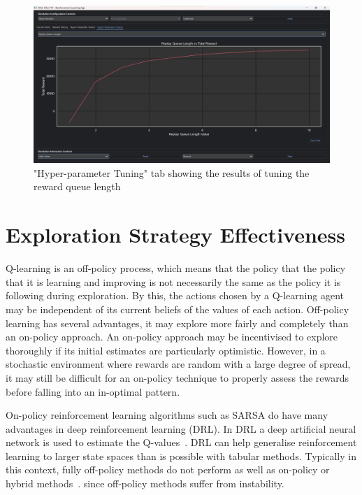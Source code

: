 \documentclass[]{final_report}
\begin{document}
\begin{figure}[H]
  \centering
  
  \includegraphics[trim={0 0 0 6mm},clip,width=\textwidth]{ui-screenshots/hyper-tuning.png}
  
  \caption{\label{fig:screenshot:current-state} "Hyper-parameter Tuning" tab showing the results of tuning the reward queue length}
\end{figure}


\chapter{Exploration Strategy Effectiveness}

Q-learning is an off-policy process, which means that the policy that the policy that it is learning and improving is not necessarily the same as the policy it is following during exploration. By this, the actions chosen by a Q-learning agent may be independent of its current beliefs of the values of each action. Off-policy learning has several advantages, it may explore more fairly and completely than an on-policy approach. An on-policy approach may be incentivised to explore thoroughly if its initial estimates are particularly optimistic. However, in a stochastic environment where rewards are random with a large degree of spread, it may still be difficult for an on-policy technique to properly assess the rewards before falling into an in-optimal pattern.  

On-policy reinforcement learning algorithms such as SARSA do have many advantages in deep reinforcement learning (DRL). In DRL a deep artificial neural network is used to estimate the Q-values~\cite{deepRLOverview}. DRL can help generalise reinforcement learning to larger state spaces than is possible with tabular methods. Typically in this context, fully off-policy methods do not perform as well as on-policy or hybrid methods~\cite{deepOnVsOffPolicy}. since off-policy methods suffer from instability.
\end{document}
